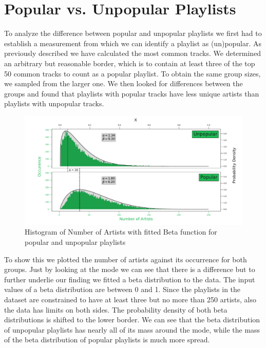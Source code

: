 \section{Popular vs. Unpopular Playlists}
To analyze the difference between popular and unpopular playlists we first had to establish a measurement from which we can identify a playlist as (un)popular. As previously described we have calculated the most common tracks. We determined an arbitrary but reasonable border, which is to contain at least three of the top 50 common tracks to count as a popular playlist. To obtain the same group sizes, we sampled from the larger one. We then looked for differences between the groups and found that playlists with popular tracks have less unique artists than playlists with unpopular tracks. 

\begin{figure}[ht]
    \centering
    \includegraphics[width=\textwidth]{fig/pop_unpop_artist.pdf}
    \caption{Histogram of Number of Artists with fitted Beta function for popular and unpopular playlists}
    \label{fig:pop_unppo_artist}
\end{figure}

To show this we plotted the number of artists against its occurrence for both groups. Just by looking at the mode we can see that there is a difference but to further underlie our finding we fitted a beta distribution to the data. The input values of a beta distribution are between 0 and 1. Since the playlists in the dataset are constrained to have at least three but no more than 250 artists, also the data has limits on both sides. The probability density of both beta distributions is shifted to the lower border. We can see that the beta distribution of unpopular playlists has nearly all of its mass around the mode, while the mass of the beta distribution of popular playlists is much more spread.

